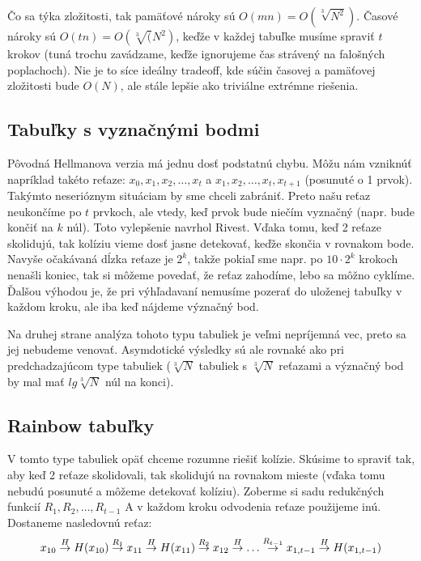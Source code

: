 Čo sa týka zložitosti, tak pamäťové nároky sú $O(mn) = O(\sqrt[3]{N^2})$. Časové nároky
sú $O(tn) = O(\sqrt[3](N^2)$, keďže v každej tabuľke musíme spraviť $t$ krokov (tuná trochu zavádzame,
keďže ignorujeme čas strávený na falošných poplachoch). Nie je to síce ideálny tradeoff, kde
súčin časovej a pamäťovej zložitosti bude $O(N)$, ale stále lepšie ako triviálne extrémne riešenia.

\subsection{Tabuľky s vyznačnými bodmi}
Pôvodná Hellmanova verzia má jednu dosť podstatnú chybu. Môžu nám vzniknúť napríklad takéto reťaze:
$x_0, x_1, x_2, \dots, x_t$ a $x_1, x_2, \dots, x_t, x_{t+1}$ (posunuté o 1 prvok). 
Takýmto neserióznym situáciam by sme chceli zabrániť. Preto našu reťaz neukončíme po $t$ prvkoch, ale
vtedy, keď prvok bude niečím vyznačný (napr. bude končiť na $k$ núl). Toto vylepšenie navrhol Rivest.
Vďaka tomu, keď 2 reťaze skolidujú, tak kolíziu vieme dosť jasne detekovať, keďže skončia v rovnakom bode.
Navyše očakávaná dĺzka reťaze je $2^k$, takže pokiaľ sme napr. po $10 \cdot 2^k$ krokoch nenašli koniec, tak si môžeme
povedať, že reťaz zahodíme, lebo sa môžno cyklíme.
Ďalšou výhodou je, že pri výhľadavaní nemusíme pozerať do uloženej tabuľky v každom kroku, ale iba keď nájdeme význačný bod.

Na druhej strane analýza tohoto typu tabuliek je veľmi nepríjemná vec, preto sa jej nebudeme venovať. 
Asymdotické výsledky sú ale rovnaké ako pri predchadzajúcom type tabuliek ($\sqrt[3]{N}$ tabuliek s $\sqrt[3]{N}$
reťazami a význačný bod by mal mať $lg \sqrt[3]{N}$ núl na konci).

\subsection{Rainbow tabuľky}
V tomto type tabuliek opäť chceme rozumne riešiť kolízie. Skúsime to spraviť tak,
aby keď 2 reťaze skolidovali, tak skolidujú na rovnakom mieste (vďaka tomu nebudú posunuté
a môžeme detekovať kolíziu). 
Zoberme si sadu redukčných funkcií $R_1, R_2, \dots, R_{t-1}$ A v každom kroku odvodenia reťaze použijeme inú.
Dostaneme nasledovnú reťaz:
\begin{equation*}
x_{10} \toa{H} H(x_{10}) \toa{R_1} x_{11} \toa{H} H(x_{11}) \toa{R_2} x_{12} \toa{H} \dots \toa{R_{t-1}} x_{1, t-1} \toa{H} H(x_{1,t-1})
\end{equation*}


